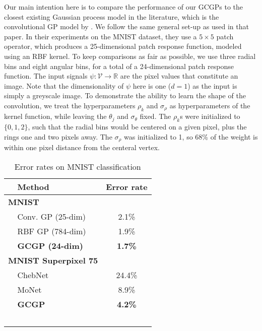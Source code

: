 \documentclass{article}
\begin{document}
Our main intention here is to compare the performance of our GCGPs to the closest existing Gaussian process model in the literature, which is the convolutional GP model by \citet{convgp}. We follow the same general set-up as used in that paper. In their experiments on the MNIST dataset, they use a $5 \times 5$ patch operator, which produces a 25-dimensional patch response function, modeled using an RBF kernel. To keep comparisons as fair as possible, we use three radial bins and eight angular bins, for a total of a 24-dimensional patch response function. The input signals $\psi: \mathcal{V} \to \mathbb{R}$ are the pixel values that constitute an image. Note that the dimensionality of $\psi$ here is one ($d=1$) as the input is simply a greyscale image. To demonstrate the ability to learn the shape of the convolution, we treat the hyperparameters $\rho_k$ and $\sigma_\rho$ as hyperparameters of the kernel function, while leaving the $\theta_j$ and $\sigma_\theta$ fixed. The $\rho_k$s were initialized to $\{0,1,2\}$, such that the radial bins would be centered on a given pixel, plus the rings one and two pixels away. The $\sigma_\rho$ was initialized to 1, so 68\% of the weight is within one pixel distance from the centeral vertex.

\begin{table}[tb]
	\centering
	\caption{Error rates on MNIST classification}
	\label{tab:MNIST}
	\begin{tabular}{llc}
		\toprule
				&Method & Error rate \\
		\midrule
    \multicolumn{2}{l}{\textbf{MNIST}} & \\ 
		&Conv. GP (25-dim) \dag	& 2.1\% \\
		&RBF GP (784-dim) \dag	& 1.9\% \\
		&\textbf{GCGP (24-dim)}	&\textbf{1.7\%} \\
		\midrule
		\multicolumn{2}{l}{\textbf{MNIST Superpixel 75}} & \\
		& ChebNet \citep{chebnet} & 24.4\% \\
		& MoNet \citep{moNet} & 8.9\% \\
		& \textbf{GCGP} & \textbf{4.2\%}\\
		\midrule
		& \dag\,\citep{convgp} & \\
	\end{tabular}
	\vspace{-0.75cm}
\end{table}
\end{document}
